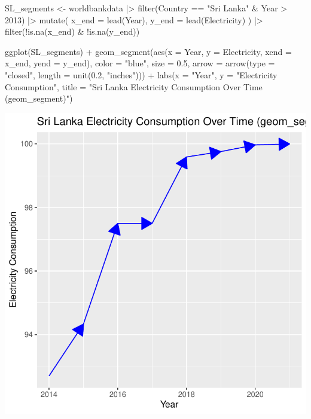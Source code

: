 \documentclass[
  letterpaper,
  DIV=11,
  numbers=noendperiod]{scrreprt}
\newenvironment{Shaded}{\begin{snugshade}}{\end{snugshade}}
\newcommand{\AttributeTok}[1]{\textcolor[rgb]{0.40,0.45,0.13}{#1}}
\newcommand{\DecValTok}[1]{\textcolor[rgb]{0.68,0.00,0.00}{#1}}
\newcommand{\FloatTok}[1]{\textcolor[rgb]{0.68,0.00,0.00}{#1}}
\newcommand{\FunctionTok}[1]{\textcolor[rgb]{0.28,0.35,0.67}{#1}}
\newcommand{\NormalTok}[1]{\textcolor[rgb]{0.00,0.23,0.31}{#1}}
\newcommand{\OtherTok}[1]{\textcolor[rgb]{0.00,0.23,0.31}{#1}}
\newcommand{\SpecialCharTok}[1]{\textcolor[rgb]{0.37,0.37,0.37}{#1}}
\newcommand{\StringTok}[1]{\textcolor[rgb]{0.13,0.47,0.30}{#1}}
\begin{document}
\begin{Shaded}
\begin{Highlighting}[]
\NormalTok{SL\_segments }\OtherTok{\textless{}{-}}\NormalTok{ worldbankdata }\SpecialCharTok{|\textgreater{}} 
  \FunctionTok{filter}\NormalTok{(Country }\SpecialCharTok{==} \StringTok{"Sri Lanka"} \SpecialCharTok{\&}\NormalTok{ Year }\SpecialCharTok{\textgreater{}} \DecValTok{2013}\NormalTok{) }\SpecialCharTok{|\textgreater{}} 
     \FunctionTok{mutate}\NormalTok{(}
    \AttributeTok{x\_end =} \FunctionTok{lead}\NormalTok{(Year), }
    \AttributeTok{y\_end =} \FunctionTok{lead}\NormalTok{(Electricity)  }
\NormalTok{  ) }\SpecialCharTok{|\textgreater{}} 
  \FunctionTok{filter}\NormalTok{(}\SpecialCharTok{!}\FunctionTok{is.na}\NormalTok{(x\_end) }\SpecialCharTok{\&} \SpecialCharTok{!}\FunctionTok{is.na}\NormalTok{(y\_end))}

 \FunctionTok{ggplot}\NormalTok{(SL\_segments) }\SpecialCharTok{+}
  \FunctionTok{geom\_segment}\NormalTok{(}\FunctionTok{aes}\NormalTok{(}\AttributeTok{x =}\NormalTok{ Year, }\AttributeTok{y =}\NormalTok{ Electricity, }\AttributeTok{xend =}\NormalTok{ x\_end, }
                   \AttributeTok{yend =}\NormalTok{ y\_end),}
               \AttributeTok{color =} \StringTok{"blue"}\NormalTok{, }\AttributeTok{size =} \FloatTok{0.5}\NormalTok{, }\AttributeTok{arrow =} \FunctionTok{arrow}\NormalTok{(}\AttributeTok{type =} \StringTok{"closed"}\NormalTok{, }\AttributeTok{length =} \FunctionTok{unit}\NormalTok{(}\FloatTok{0.2}\NormalTok{, }\StringTok{"inches"}\NormalTok{))) }\SpecialCharTok{+}
  \FunctionTok{labs}\NormalTok{(}\AttributeTok{x =} \StringTok{"Year"}\NormalTok{,}
       \AttributeTok{y =} \StringTok{"Electricity Consumption"}\NormalTok{,}
       \AttributeTok{title =} \StringTok{"Sri Lanka Electricity Consumption Over Time (geom\_segment)"}\NormalTok{)}
\end{Highlighting}
\end{Shaded}

\includegraphics{s_files/figure-pdf/unnamed-chunk-5-1.pdf}
\end{document}
